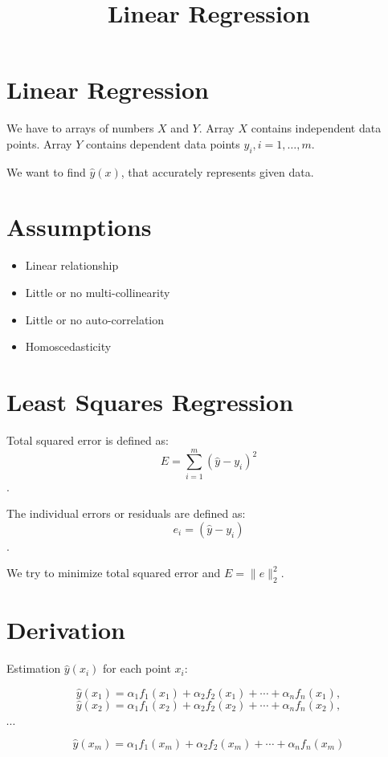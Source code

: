\documentclass{article}
\title{Linear Regression}
\begin{document}
  \maketitle
  \newpage

\section*{Linear Regression}
We have to arrays of numbers $X$ and $Y$. Array $X$ contains independent data points. Array $Y$ contains dependent data points $y_i,i=1,…,m$.

We want to find $\hat{y}(x)$, that accurately represents given data.\\

\section*{Assumptions}

\begin{itemize}
\item Linear relationship
\item Little or no multi-collinearity
\item Little or no auto-correlation
\item Homoscedasticity
\end{itemize}

\section*{Least Squares Regression}

Total squared error is defined as: 
$$E = \sum_{i=1}^m (\hat{y} - y_i)^2$$. 

The individual errors or residuals are defined as: 
$$e_i = (\hat{y} - y_i)$$.

We try to minimize total squared error and $E = \|{e}\|_{2}^{2}$.

\section*{Derivation}

Estimation $\hat{y}(x_i)$ for each point $x_i$:

$$\hat{y}(x_1) = {\alpha}_1 f_1(x_1) + {\alpha}_2 f_2(x_1) + \cdots + {\alpha}_n f_n(x_1),$$
$$\hat{y}(x_2) = {\alpha}_1 f_1(x_2) + {\alpha}_2 f_2(x_2) + \cdots + {\alpha}_n f_n(x_2),$$
\begin{center}$ \cdots $ \end{center}
$$\hat{y}(x_m) = {\alpha}_1 f_1(x_m) + {\alpha}_2 f_2(x_m) + \cdots + {\alpha}_n f_n(x_m)$$
\end{document}
